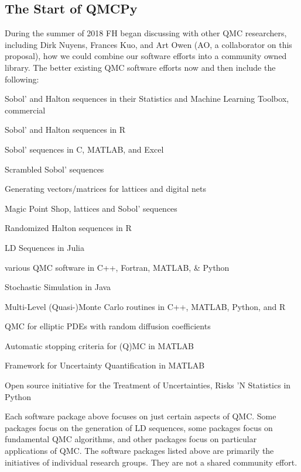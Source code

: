 \documentclass[11pt]{NSFamsart}
\begin{document}
\subsection{The Start of QMCPy}
During the summer of 2018 FH began discussing with other QMC researchers, including Dirk Nuyens, Frances Kuo, and Art Owen (AO, a collaborator on this proposal), how we could combine our software efforts into a community owned library.  The better existing QMC software efforts now and then include the following:
\begin{description}[format=\textup]
	\item[MATLAB] Sobol' and Halton sequences in their Statistics and Machine Learning Toolbox, commercial \cite{MAT9.8}
	\item [qrng]  Sobol' and Halton sequences in R \cite{QRNG2020}
	\item[BRODA] Sobol' sequences in C, MATLAB, and Excel \cite{BRODA20a}
	\item[PyTorch] Scrambled Sobol' sequences \cite{PyTorch}
	\item[LatNet Builder] Generating vectors/matrices for lattices and digital nets \cite{LatNet}
	\item[MPS] Magic Point Shop, lattices and Sobol' sequences \cite{Nuy17a}
	\item[Owen] Randomized Halton sequences in R \cite{Owe20a}
	\item[Robbe] LD Sequences in Julia \cite{Rob20a}
	\item[Burkhardt] various QMC software in C++, Fortran, MATLAB, \& Python \cite{Bur20a}
	\item[SSJ] Stochastic Simulation in Java \cite{SSJ}
	\item[ML(Q)MC] Multi-Level (Quasi-)Monte Carlo routines in C++, MATLAB, Python, and R \cite{GilesSoft}
	\item[QMC4PDE] QMC for elliptic PDEs with random diffusion coefficients \cite{KuoNuy16a}
	\item[GAIL] Automatic stopping criteria for (Q)MC in MATLAB \cite{ChoEtal20a}
	\item[UQLab] Framework for Uncertainty Quantification in MATLAB \cite{UQLab2014}
	\item[OpenTURNS] Open source initiative for the Treatment of Uncertainties, Risks 'N Statistics in Python \cite{OpenTURNS}
\end{description}
Each software package above  focuses on just certain aspects of QMC.  Some packages focus on the generation of LD sequences, some packages focus on fundamental QMC algorithms, and other packages focus on particular applications of QMC.  The software packages listed above are primarily the initiatives of individual research groups.  They are not a shared community effort.
\end{document}

